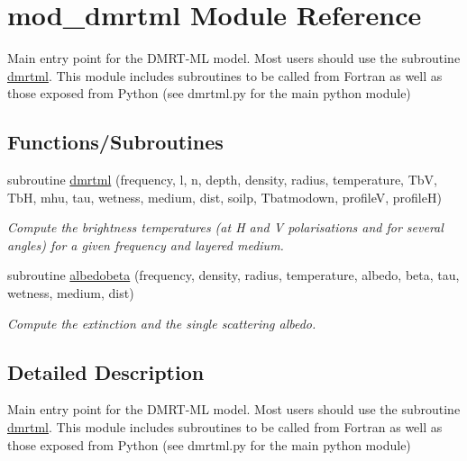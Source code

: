 \hypertarget{namespacemod__dmrtml}{
\section{mod\_\-dmrtml Module Reference}
\label{namespacemod__dmrtml}
}


Main entry point for the DMRT-\/ML model. Most users should use the subroutine \hyperlink{namespacemod__dmrtml_a94e501354576e7f5a2356c0dc4dfa5c9}{dmrtml}. This module includes subroutines to be called from Fortran as well as those exposed from Python (see dmrtml.py for the main python module)  


\subsection*{Functions/Subroutines}
\begin{DoxyCompactItemize}
\item 
subroutine \hyperlink{namespacemod__dmrtml_a94e501354576e7f5a2356c0dc4dfa5c9}{dmrtml} (frequency, l, n, depth, density, radius, temperature, TbV, TbH, mhu, tau, wetness, medium, dist, soilp, Tbatmodown, profileV, profileH)
\begin{DoxyCompactList}\small\item\em Compute the brightness temperatures (at H and V polarisations and for several angles) for a given frequency and layered medium. \end{DoxyCompactList}\item 
subroutine \hyperlink{namespacemod__dmrtml_a61888a6420e93081837312de600ae86f}{albedobeta} (frequency, density, radius, temperature, albedo, beta, tau, wetness, medium, dist)
\begin{DoxyCompactList}\small\item\em Compute the extinction and the single scattering albedo. \end{DoxyCompactList}\end{DoxyCompactItemize}


\subsection{Detailed Description}
Main entry point for the DMRT-\/ML model. Most users should use the subroutine \hyperlink{namespacemod__dmrtml_a94e501354576e7f5a2356c0dc4dfa5c9}{dmrtml}. This module includes subroutines to be called from Fortran as well as those exposed from Python (see dmrtml.py for the main python module) 

